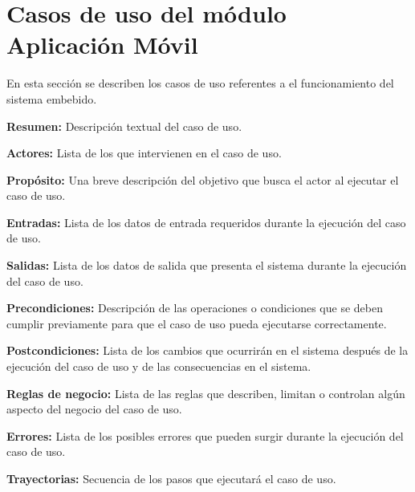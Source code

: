 
\section{Casos de uso del módulo Aplicación Móvil}
En esta sección se describen los casos de uso referentes a el funcionamiento del sistema embebido. \bigskip

     \begin{objetivos}
	\item {\bf Resumen:} Descripción textual del caso de uso.
	\item {\bf Actores:} Lista de los que intervienen en el caso de uso.
	\item {\bf Propósito:} Una breve descripción del objetivo que busca el actor al ejecutar el caso de uso.
	\item {\bf Entradas:} Lista de los datos de entrada requeridos durante la ejecución del caso de uso.
	\item {\bf Salidas:} Lista de los datos de salida que presenta el sistema durante la ejecución del caso de uso.
	\item {\bf Precondiciones:} Descripción de las operaciones o condiciones que se deben cumplir previamente para que el caso de uso pueda ejecutarse correctamente.
	\item {\bf Postcondiciones:} Lista de los cambios que ocurrirán en el sistema después de la ejecución del caso de uso y de las consecuencias en el sistema.
	\item {\bf Reglas de negocio:} Lista de las reglas que describen, limitan o controlan algún aspecto del negocio del caso de uso.
	\item {\bf Errores:} Lista de los posibles errores que pueden surgir durante la ejecución del caso de uso.
	\item {\bf Trayectorias:} Secuencia de los pasos que ejecutará el caso de uso.
    \end{objetivos}


